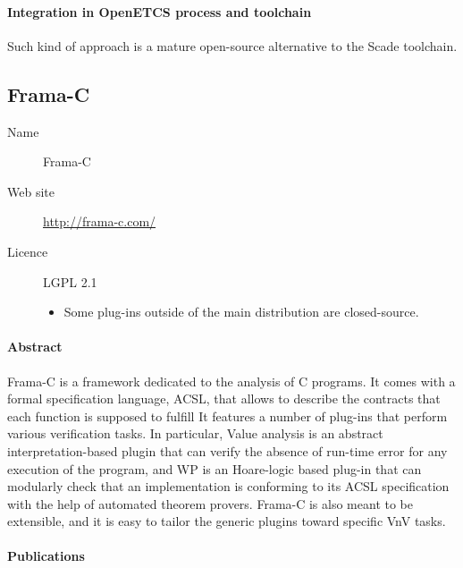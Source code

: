 \paragraph{Integration in OpenETCS process and toolchain}

Such kind of approach is a mature open-source alternative to the Scade toolchain.

\subsection{Frama-C}\label{sec:frama-c}
\begin{description}
\item[Name] Frama-C
\item[Web site] \url{http://frama-c.com/}
\item[Licence] LGPL 2.1
  \begin{itemize}
    \item Some plug-ins outside of the main distribution are closed-source.
  \end{itemize}
\end{description}

\paragraph{Abstract}
Frama-C is a framework dedicated to the analysis of C programs. It comes
with a formal specification language, ACSL, that allows to describe the
contracts that each function is supposed to fulfill It features a
number of plug-ins that perform various verification tasks. In particular,
Value analysis is an abstract interpretation-based plugin that can verify the
absence of run-time error for any execution of the program, and WP is an 
Hoare-logic based plug-in that can modularly check that an implementation
is conforming to its ACSL specification with the help of automated theorem
provers. Frama-C is also meant to be extensible, and it is easy to tailor
the generic plugins toward specific VnV tasks.

\paragraph{Publications}

